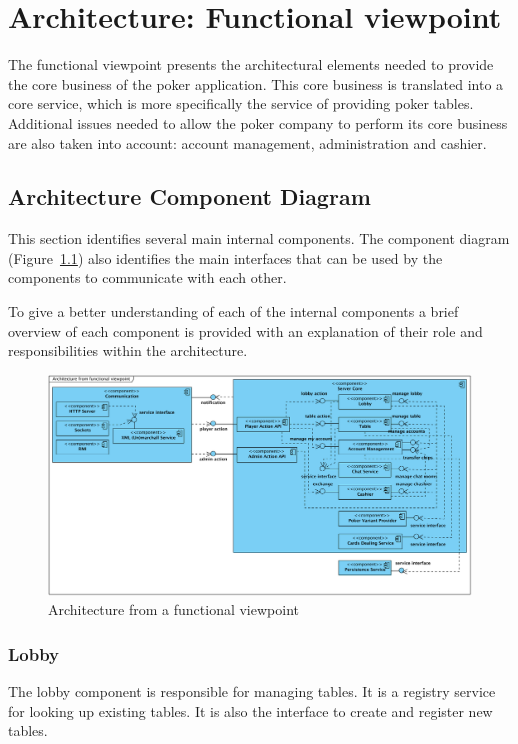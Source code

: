 \documentclass[a4paper,11pt]{report}
\begin{document}
\chapter{Architecture: Functional viewpoint}
The functional viewpoint presents the architectural elements needed to provide the core business of the poker application. This core business is translated into a core service, which is more specifically the service of providing poker tables. Additional issues needed to allow the poker company to perform its core business are also taken into account: account management, administration and cashier.

\section{Architecture Component Diagram}
This section identifies several main internal components. The component diagram (Figure~\ref{fig:component}) also identifies the main interfaces that can be used by the components to communicate with each other.

To give a better understanding of each of the internal components a brief overview of each component is provided with an explanation of their role and responsibilities within the architecture.

\begin{figure}
  \begin{center}
    \includegraphics[angle=90, scale=0.6]{img_architecture_component_diagram.png}
  \end{center}
  \caption{Architecture from a functional viewpoint}\label{fig:component}
\end{figure}

\subsection{Lobby}
The lobby component is responsible for managing tables. It is a registry service for looking up existing tables. It is also the interface to create and register new tables. 
\end{document}
